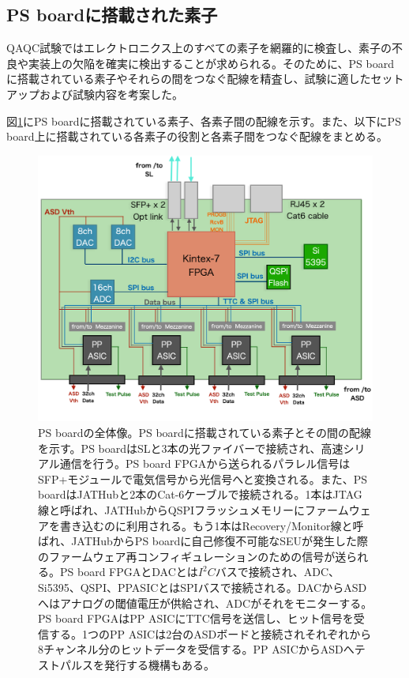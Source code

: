 \newpage
\subsection{PS boardに搭載された素子}
\label{subsec_PSBelements}
QAQC試験ではエレクトロニクス上のすべての素子を網羅的に検査し、素子の不良や実装上の欠陥を確実に検出することが求められる。そのために、PS boardに搭載されている素子やそれらの間をつなぐ配線を精査し、試験に適したセットアップおよび試験内容を考案した。

図\ref{PSBconcept}にPS boardに搭載されている素子、各素子間の配線を示す。また、以下にPS board上に搭載されている各素子の役割と各素子間をつなぐ配線をまとめる。

\begin{figure} 
\centering
\includegraphics[width=16cm]{fig/QAQC/PSBoverall.png}
\caption[PS boardの全体像]{PS boardの全体像。PS boardに搭載されている素子とその間の配線を示す。PS boardはSLと3本の光ファイバーで接続され、高速シリアル通信を行う。PS board FPGAから送られるパラレル信号はSFP+モジュールで電気信号から光信号へと変換される。また、PS boardはJATHubと2本のCat-6ケーブルで接続される。1本はJTAG線と呼ばれ、JATHubからQSPIフラッシュメモリーにファームウェアを書き込むのに利用される。もう1本はRecovery/Monitor線と呼ばれ、JATHubからPS boardに自己修復不可能なSEUが発生した際のファームウェア再コンフィギュレーションのための信号が送られる。PS board FPGAとDACとは$I^{2}C$バスで接続され、ADC、Si5395、QSPI、PPASICとはSPIバスで接続される。DACからASDへはアナログの閾値電圧が供給され、ADCがそれをモニターする。PS board FPGAはPP ASICにTTC信号を送信し、ヒット信号を受信する。1つのPP ASICは2台のASDボードと接続されそれぞれから8チャンネル分のヒットデータを受信する。PP ASICからASDへテストパルスを発行する機構もある。}
\label{PSBconcept}
\end{figure}

